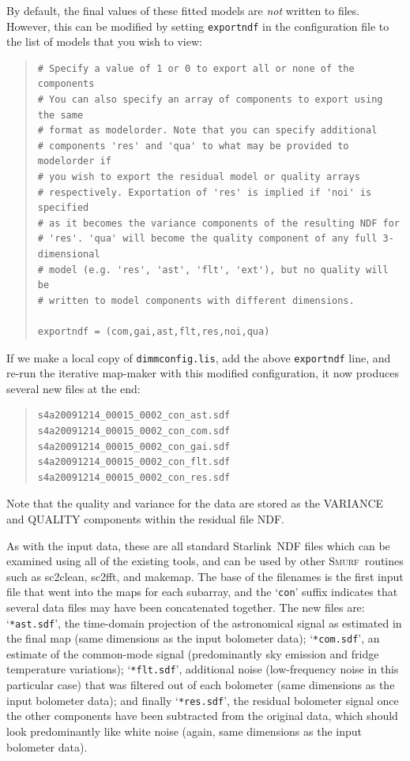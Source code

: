 \documentclass[twoside,11pt]{article}
\newcommand{\htmladdnormallink}[2]{#1}
\newcommand{\xref}[3]{#1}
\renewcommand{\_}{\texttt{\symbol{95}}}
\newenvironment{myquote}{\begin{quote}\begin{small}}{\end{small}\end{quote}}
\newcommand{\starlink}{\htmladdnormallink{Starlink}{http://starlink.jach.hawaii.edu}}
\newcommand{\smurf}{\xref{\textsc{Smurf}}{sun258}{}}
\newcommand{\task}[1]{\textsf{#1}}
\newcommand{\fft}{\xref{\task{sc2fft}}{sun258}{SC2FFT}}
\newcommand{\clean}{\xref{\task{sc2clean}}{sun258}{SC2CLEAN}}
\newcommand{\makemap}{\xref{\task{makemap}}{sun258}{MAKEMAP}}
\begin{document}
By default, the final values of these fitted models are {\em not}
written to files. However, this can be modified by setting
\texttt{exportndf} in the configuration file to the list of models
that you wish to view:

\begin{myquote}
\begin{verbatim}
# Specify a value of 1 or 0 to export all or none of the components
# You can also specify an array of components to export using the same
# format as modelorder. Note that you can specify additional
# components 'res' and 'qua' to what may be provided to modelorder if
# you wish to export the residual model or quality arrays
# respectively. Exportation of 'res' is implied if 'noi' is specified
# as it becomes the variance components of the resulting NDF for
# 'res'. 'qua' will become the quality component of any full 3-dimensional
# model (e.g. 'res', 'ast', 'flt', 'ext'), but no quality will be
# written to model components with different dimensions.

exportndf = (com,gai,ast,flt,res,noi,qua)
\end{verbatim}
\end{myquote}

If we make a local copy of \texttt{dimmconfig.lis}, add the above
\texttt{exportndf} line, and re-run the iterative map-maker with this
modified configuration, it now produces several new files at the end:

\begin{myquote}
\begin{verbatim}
s4a20091214_00015_0002_con_ast.sdf
s4a20091214_00015_0002_con_com.sdf
s4a20091214_00015_0002_con_gai.sdf
s4a20091214_00015_0002_con_flt.sdf
s4a20091214_00015_0002_con_res.sdf
\end{verbatim}
\end{myquote}

Note that the quality and variance for the data are stored as the
VARIANCE and QUALITY components within the residual file NDF.

As with the input data, these are all standard \starlink\ NDF files
which can be examined using all of the existing tools, and can be used
by other \smurf\ routines such as \clean, \fft, and \makemap. The base
of the filenames is the first input file that went into the maps for
each subarray, and the `\texttt{con}' suffix indicates that several
data files may have been concatenated together. The new files are:
`\texttt{*ast.sdf}', the time-domain projection of the astronomical
signal as estimated in the final map (same dimensions as the input
bolometer data); `\texttt{*com.sdf}', an estimate of the common-mode
signal (predominantly sky emission and fridge temperature variations);
`\texttt{*flt.sdf}', additional noise (low-frequency noise in this
particular case) that was filtered out of each bolometer (same
dimensions as the input bolometer data); and finally
`\texttt{*res.sdf}', the residual bolometer signal once the other
components have been subtracted from the original data, which should
look predominantly like white noise (again, same dimensions as the
input bolometer data).
\end{document}
